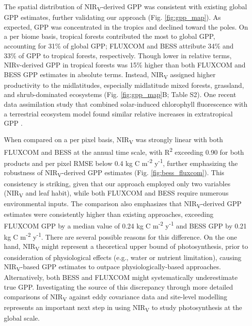 \documentclass[10pt,letterpaper]{article}
\begin{document}
The spatial distribution of NIR\textsubscript{V}-derived GPP was consistent with existing global GPP estimates, further validating our approach  (Fig. \ref{fig:gpp_map}). As expected, GPP was concentrated in the tropics and declined toward the poles. On a per biome basis, tropical forests contributed the most to global GPP, accounting for 31\%  of global GPP; FLUXCOM and BESS attribute 34\% and 33\% of GPP to tropical forests, respectively. Though lower in relative terms, NIRv-derived GPP in tropical forests was 15\% higher than both FLUXCOM and BESS GPP estimates in absolute terms.  Instead, NIR\textsubscript{V} assigned higher productivity to the midlatitudes, especially  midlatitude mixed forests, grassland, and shrub-dominated ecosystems (Fig. \ref{fig:gpp_map}B; Table S2). One recent data assimilation study that combined solar-induced chlorophyll fluorescence with a terrestrial ecosystem model found similar relative increases in extratropical GPP \cite{Norton2018}.

When compared on a per pixel basis, NIR\textsubscript{V} was strongly linear with both FLUXCOM and BESS at the annual time scale, with R\textsuperscript{2} exceeding 0.90 for both products and per pixel RMSE below 0.4 kg C m\textsuperscript{-2} y\textsuperscript{-1}, further emphasizing the robustness of NIR\textsubscript{V}-derived GPP estimates (Fig. \ref{fig:bess_fluxcom}). This consistency is striking, given that our approach employed only two variables (NIR\textsubscript{V} and leaf habit), while both FLUXCOM and BESS require numerous environmental inputs. The comparison also emphasizes that NIR\textsubscript{V}-derived GPP estimates were consistently higher than existing approaches, exceeding FLUXCOM GPP by a median value of 0.24 kg C m\textsuperscript{-2} y\textsuperscript{-1} and BESS GPP by 0.21 kg C m\textsuperscript{-2} y\textsuperscript{-1}. There are several possible reasons for this difference. On the one hand, NIR\textsubscript{V} might represent a theoretical upper bound of photosynthesis, prior to consideration of physiological effects (e.g.,  water or nutrient limitation), causing NIR\textsubscript{V}-based GPP estimates to outpace physiologically-based approaches. Alternatively, both BESS and FLUXCOM might systematically underestimate true GPP. Investigating the source of this discrepancy through more detailed comparisons of NIR\textsubscript{V} against eddy covariance data and site-level modelling represents an important next step in using NIR\textsubscript{V} to study photosynthesis at the global scale.
\end{document}
